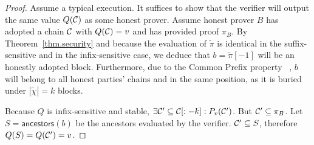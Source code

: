 \begin{proof}
Assume a typical execution. It suffices to show that the verifier will output
the same value $Q(\mathcal{C})$ as some honest prover. Assume honest prover $B$ has
adopted a chain $\mathcal{C}$ with $Q(\mathcal{C}) = v$ and has provided proof
$\pi_B$. By Theorem~\ref{thm.security} and because the evaluation of $\tilde\pi$
is identical in the suffix-sensitive and in the infix-sensitive case, we deduce
that $b = \tilde\pi[-1]$ will be an honestly adopted block. Furthermore, due to
the Common Prefix property~ \cite{backbone}, $b$ will belong to all honest
parties' chains and in the same position, as it is buried under $|\tilde\chi| =
k$ blocks.

Because $Q$ is infix-sensitive and stable, $\exists \mathcal{C}' \subseteq
\mathcal{C}[:-k]: P_v(\mathcal{C}')$. But $\mathcal{C}' \subseteq \pi_B$. Let $S =
\textsf{ancestors}(b)$ be the ancestors evaluated by the verifier. $\mathcal{C}'
\subseteq S$, therefore $Q(S) = Q(\mathcal{C}') = v$.
\Qed
\end{proof}
